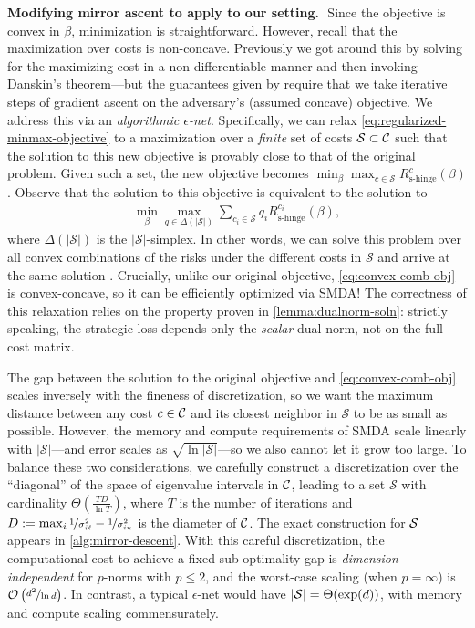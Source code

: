 \documentclass{article}
\newcommand{\costset}{\gC}
\newcommand{\costfunc}{c}
\newcommand{\shingepoprisk}{R_{\textrm{s-hinge}}}
\newcommand{\mincostscale}[1]{\sigma_{#1\ell}}
\newcommand{\maxcostscale}[1]{\sigma_{#1u}}
\newcommand{\cinc}{{\costfunc\in\costset}}
\theoremstyle{definition}
\renewcommand{\paragraph}[1]{{\textbf{#1}\,\,}}
\begin{document}
\paragraph{Modifying mirror ascent to apply to our setting.} Since the objective is convex in $\beta$, minimization is straightforward. However, recall that the maximization over costs is non-concave. Previously we got around this by solving for the maximizing cost in a non-differentiable manner and then invoking Danskin's theorem---but the guarantees given by \citet{nemirovski2009robust} require that we take iterative steps of gradient ascent on the adversary's (assumed concave) objective. We address this via an \emph{algorithmic $\epsilon$-net}. Specifically, we can relax \cref{eq:regularized-minmax-objective} to a maximization over a \emph{finite} set of costs $\mathcal{S}\subset \costset$ such that the solution to this new objective is provably close to that of the original problem. Given such a set, the new objective becomes $\min_{\beta} \max_{\costfunc\in \mathcal{S}} \shingepoprisk^c(\beta)$.
Observe that the solution to this objective is equivalent to the solution to
\begin{align}
    \label{eq:convex-comb-obj}
    \min_{\beta} \max_{q\in\Delta(|\mathcal{S}|)} \sum_{c_i\in \mathcal{S}} q_i\shingepoprisk^{c_i}(\beta),
\end{align}
where $\Delta(|\mathcal{S}|)$ is the $|\mathcal{S}|$-simplex. In other words, we can solve this problem over all convex combinations of the risks under the different costs in $\mathcal{S}$ and arrive at the same solution \citep{rosenfeld2022domain, rosenfeld2022online}. Crucially, unlike our original objective, \cref{eq:convex-comb-obj} is convex-concave, so it can be efficiently optimized via SMDA! The correctness of this relaxation relies on the property proven in \cref{lemma:dualnorm-soln}: strictly speaking, the strategic loss depends only the \emph{scalar} dual norm, not on the full cost matrix.

The gap between the solution to the original objective and \cref{eq:convex-comb-obj} scales inversely with the fineness of discretization, so we want the maximum distance between any cost $\cinc$ and its closest neighbor in $\mathcal{S}$ to be as small as possible. However, the memory and compute requirements of SMDA scale linearly with $|\mathcal{S}|$---and error scales as $\sqrt{\ln |\mathcal{S}|}$---so we also cannot let it grow too large. To balance these two considerations, we carefully construct a discretization over the ``diagonal'' of the space of eigenvalue intervals in $\costset$, leading to a set $\mathcal{S}$ with cardinality $\Theta\left(\frac{T D}{\ln T} \right)$, where $T$ is the number of iterations and $D := \max_i \nicefrac{1}{\mincostscale{i}^2} - \nicefrac{1}{\maxcostscale{i}^2}$ is the diameter of $\costset$. The exact construction for ${\mathcal{S}}$ appears in \cref{alg:mirror-descent}. With this careful discretization, the computational cost to achieve a fixed sub-optimality gap is \emph{dimension independent} for $p$-norms with $p \leq 2$, and the worst-case scaling (when $p=\infty$) is $\mathcal{O}\left(\nicefrac{d^2}{\ln d}\right)$. In contrast, a typical $\epsilon$-net would have $|{\mathcal{S}}| = \Theta(\exp(d))$, with memory and compute scaling commensurately.
\end{document}
